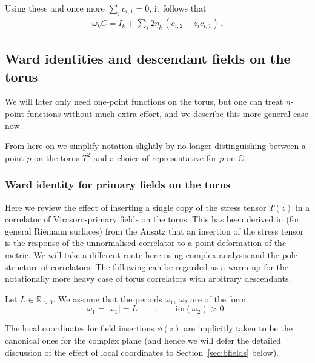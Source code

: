 \documentclass[11pt,a4paper]{article}
\numberwithin{equation}{section}
\begin{document}
\noindent
Using these and once more $\sum_ic_{i,1} =0$, it follows that
%
\begin{align}\label{eq:C1}  
    \omega_k C = I_k + \sum_{i} 
    2\eta_k\,
    \left( c_{i,2} +  z_i c_{i,1} \right)\,.
\end{align}



\subsection{Ward identities and descendant fields on the torus}\label{sec:torus-correlators}

We will later only need one-point functions on the torus, but one can treat $n$-point functions without much extra effort, and we describe this more general case now. 

From here on we simplify notation slightly by no longer distinguishing between a point $p$ on the torus $T^2$ and a choice of representative for $p$ on $\mathbb{C}$.

\subsubsection{Ward identity for primary fields on the torus}

Here we review the effect of inserting a single copy of the stress tensor $T(z)$ in a correlator of Virasoro-primary fields on the torus. This has been derived in \cite{Eguchi:1986sb} (for general Riemann surfaces) from the Ansatz that an insertion of the stress tensor is the response of the unnormalised correlator to a point-deformation of the metric. We will take a different route here using complex analysis and the pole structure of correlators. The following can be regarded as a warm-up for the notationally more heavy case of torus correlators with arbitrary descendants. 

Let $L \in \mathbb{R}_{>0}$. 
We assume that the periods $\omega_1$, $\omega_2$ are of the form
\begin{equation}
  \omega_1 = |\omega_1| = L
  \qquad , \qquad  \mathrm{im}(\omega_2)>0 ~. \nonumber
\end{equation}

\noindent 
The local coordinates for field insertions $\phi(z)$ are implicitly taken to be the canonical ones for the complex plane (and hence we will defer the detailed discussion of the effect of local coordinates to Section~\ref{sec:bfields} below).
\end{document}
